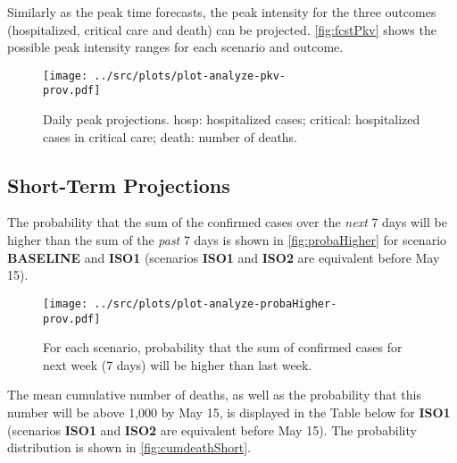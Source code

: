 \documentclass[10pt]{article}
\newcommand{\scen}[1]{\textbf{\textsf{#1}}}
\begin{document}
Similarly as the peak time forecasts, the peak intensity for the three outcomes (hospitalized, critical care and death) can be projected. \autoref{fig:fcstPkv} shows the possible peak intensity ranges for each scenario and outcome.

\begin{figure}[h!]
\begin{center}
\texttt{[image: ../src/plots/plot-analyze-pkv-\\prov.pdf]}
\caption{Daily peak projections. \textsf{hosp}: hospitalized cases; \textsf{critical}: hospitalized cases in critical care; \textsf{death}: number of deaths.}
\label{fig:fcstPkv}
\end{center}
\end{figure}




\newpage

\subsection*{Short-Term Projections}

The probability that the sum of the confirmed cases over the \emph{next} 7 days will be higher than the sum of the \emph{past} 7 days is shown in \autoref{fig:probaHigher} for  scenario \scen{BASELINE} and \scen{ISO1} (scenarios \scen{ISO1} and \scen{ISO2} are equivalent before May 15).

\begin{figure}[h!]
\begin{center}
\texttt{[image: ../src/plots/plot-analyze-probaHigher-\\prov.pdf]}
\caption{For each scenario, probability that the sum of confirmed cases for next week (7 days) will be higher than last week. }
\label{fig:probaHigher}
\end{center}
\end{figure}


The mean cumulative number of deaths, as well as the probability that this number will be above 1,000 by May 15, is displayed in the Table below for %
\scen{ISO1} (scenarios \scen{ISO1} and \scen{ISO2} are equivalent before May 15). The probability distribution is shown in \autoref{fig:cumdeathShort}.
\end{document}
